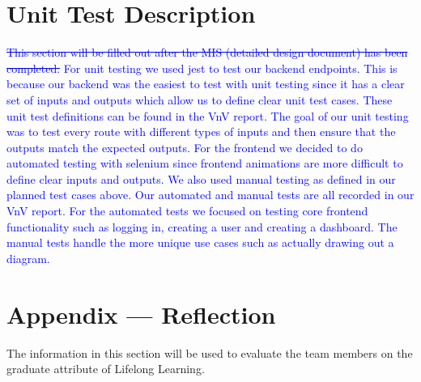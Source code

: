 \documentclass[12pt, titlepage]{article}
\begin{document}
\section{Unit Test Description}
\textcolor{blue}{\sout{This section will be filled out after the MIS (detailed design document) has been completed.} For unit testing we used jest to test our backend endpoints. This is because our backend was the easiest to test with unit testing since it has a clear set of inputs and outputs which allow us to define clear unit test cases. These unit test definitions can be found in the VnV report. The goal of our unit testing was to test every route with different types of inputs and then ensure that the outputs match the expected outputs.
For the frontend we decided to do automated testing with selenium since frontend animations are more difficult to define clear inputs and outputs. We also used manual testing as defined in our planned test cases above. Our automated and manual tests are all recorded in our VnV report. For the automated tests we focused on testing core frontend functionality such as logging in, creating a user and creating a dashboard. The manual tests handle the more unique use cases such as actually drawing out a diagram.} 
				

\newpage

\section*{Appendix --- Reflection}

The information in this section will be used to evaluate the team members on the
graduate attribute of Lifelong Learning.


\end{document}
